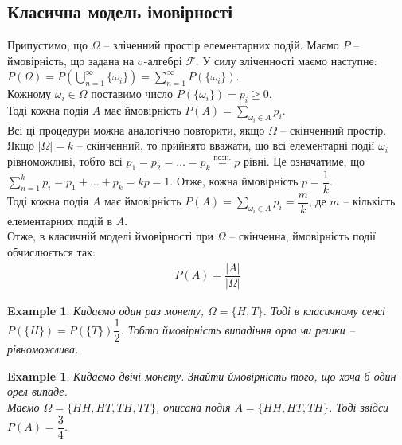 \documentclass[a4paper, 10pt]{article}
\theoremstyle{theoremdd}
\newtheorem{example}[theorem]{Example}
\begin{document}
\subsection{Класична модель імовірності}
Припустимо, що $\Omega$ -- зліченний простір елементарних подій. Маємо $P$ -- ймовірність, що задана на $\sigma$-алгебрі $\mathcal{F}$. У силу зліченності маємо наступне:\\
$P(\Omega) = \displaystyle P\left( \bigcup_{n=1}^\infty \{\omega_i\} \right) = \sum_{n=1}^\infty P(\{\omega_i\})$.\\
Кожному $\omega_i \in \Omega$ поставимо число $P(\{\omega_i\}) = p_i \geq 0$.\\
Тоді кожна подія $A$ має ймовірність $P(A) = \displaystyle\sum_{\omega_i \in A} p_i$.
\bigskip \\
Всі ці процедури можна аналогічно повторити, якщо $\Omega$ -- скінченний простір.\\
Якщо $|\Omega| = k$ -- скінченний, то прийнято вважати, що всі елементарні події $\omega_i$ рівноможливі, тобто всі $p_1 = p_2 = \dots = p_k \overset{\text{позн.}}{=} p$ рівні. Це означатиме, що $\displaystyle\sum_{n=1}^k p_i = p_1 + \dots + p_k = k p = 1$. Отже, кожна ймовірність $p = \dfrac{1}{k}$.\\
Тоді кожна подія $A$ має ймовірність $P(A) = \displaystyle\sum_{\omega_i \in A} p_i = \dfrac{m}{k}$, де $m$ -- кількість елементарних подій в $A$.\\
Отже, в класичній моделі ймовірності при $\Omega$ -- скінченна, ймовірність події обчислюється так:
\begin{align*}
P(A) = \dfrac{|A|}{|\Omega|}
\end{align*}

\begin{example}
Кидаємо один раз монету, $\Omega = \{H,T\}$. Тоді в класичному сенсі $P(\{H\}) = P(\{T\}) \dfrac{1}{2}$. Тобто ймовірність випадіння орла чи решки -- рівноможлива.
\end{example}

\begin{example}
Кидаємо двічі монету. Знайти ймовірність того, що хоча б один орел випаде.\\
Маємо $\Omega = \{HH,HT,TH,TT\}$, описана подія $A = \{HH,HT,TH\}$. Тоді звідси $P(A) = \dfrac{3}{4}$.
\end{example}
\end{document}
